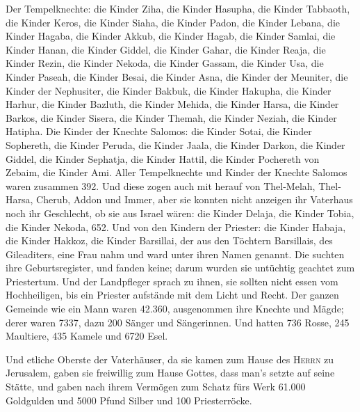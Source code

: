  Der Tempelknechte: die Kinder Ziha, die Kinder Hasupha,
die Kinder Tabbaoth,  die Kinder Keros, die Kinder Siaha,
die Kinder Padon,  die Kinder Lebana, die Kinder Hagaba,
die Kinder Akkub,  die Kinder Hagab, die Kinder Samlai,
die Kinder Hanan,  die Kinder Giddel, die Kinder Gahar,
die Kinder Reaja,  die Kinder Rezin, die Kinder Nekoda,
die Kinder Gassam,  die Kinder Usa, die Kinder Paseah,
die Kinder Besai,  die Kinder Asna, die Kinder der
Meuniter, die Kinder der Nephusiter,  die Kinder Bakbuk,
die Kinder Hakupha, die Kinder Harhur,  die Kinder
Bazluth, die Kinder Mehida, die Kinder Harsa,  die Kinder
Barkos, die Kinder Sisera, die Kinder Themah,  die Kinder
Neziah, die Kinder Hatipha.  Die Kinder der Knechte
Salomos: die Kinder Sotai, die Kinder Sophereth, die Kinder Peruda,
 die Kinder Jaala, die Kinder Darkon, die Kinder Giddel,
 die Kinder Sephatja, die Kinder Hattil, die Kinder
Pochereth von Zebaim, die Kinder Ami.  Aller
Tempelknechte und Kinder der Knechte Salomos waren zusammen 392.
 Und diese zogen auch mit herauf von Thel-Melah,
Thel-Harsa, Cherub, Addon und Immer, aber sie konnten nicht anzeigen ihr
Vaterhaus noch ihr Geschlecht, ob sie aus Israel wären: 
die Kinder Delaja, die Kinder Tobia, die Kinder Nekoda, 652.
 Und von den Kindern der Priester: die Kinder Habaja, die
Kinder Hakkoz, die Kinder Barsillai, der aus den Töchtern Barsillais,
des Gileaditers, eine Frau nahm und ward unter ihren Namen genannt.
 Die suchten ihre Geburtsregister, und fanden keine;
darum wurden sie untüchtig geachtet zum Priestertum.  Und
der Landpfleger sprach zu ihnen, sie sollten nicht essen vom
Hochheiligen, bis ein Priester aufstände mit dem Licht und Recht.
 Der ganzen Gemeinde wie ein Mann waren 42.360,
 ausgenommen ihre Knechte und Mägde; derer waren 7337,
dazu 200 Sänger und Sängerinnen.  Und hatten 736 Rosse,
245 Maultiere,  435 Kamele und 6720 Esel.

 Und etliche Oberste der Vaterhäuser, da sie kamen zum
Hause des \textsc{Herrn} zu Jerusalem, gaben sie freiwillig zum Hause
Gottes, dass man's setzte auf seine Stätte,  und gaben
nach ihrem Vermögen zum Schatz fürs Werk 61.000 Goldgulden und 5000
Pfund Silber und 100 Priesterröcke.

